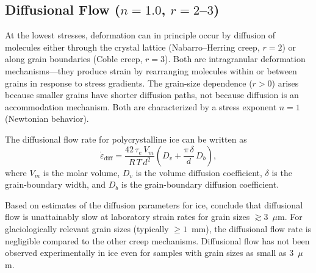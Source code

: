 \documentclass[11pt]{article}
\begin{document}
\subsection{Diffusional Flow ($n = 1.0$, $r = 2$--$3$)}
\label{sec:diffusion}

At the lowest stresses, deformation can in principle occur by diffusion of molecules either through the crystal lattice (Nabarro--Herring creep, $r = 2$) or along grain boundaries (Coble creep, $r = 3$).  Both are intragranular deformation mechanisms---they produce strain by rearranging molecules within or between grains in response to stress gradients.  The grain-size dependence ($r > 0$) arises because smaller grains have shorter diffusion paths, not because diffusion is an accommodation mechanism.  Both are characterized by a stress exponent $n = 1$ (Newtonian behavior).

\medskip
\noindent The diffusional flow rate for polycrystalline ice can be written as
\begin{equation}
  \dot{\varepsilon}_{\text{diff}} = \frac{42\,\tau_e\,V_m}{R\,T\,d^2}\!\left(D_v + \frac{\pi\,\delta}{d}\,D_b\right),
  \label{eq:diffusion}
\end{equation}
where $V_m$ is the molar volume, $D_v$ is the volume diffusion coefficient, $\delta$ is the grain-boundary width, and $D_b$ is the grain-boundary diffusion coefficient.

\medskip
\noindent Based on estimates of the diffusion parameters for ice, \cite{GoldsbyKohlstedt2001} conclude that diffusional flow is unattainably slow at laboratory strain rates for grain sizes $\gtrsim 3$~$\mu$m.  For glaciologically relevant grain sizes (typically $\geq 1$~mm), the diffusional flow rate is negligible compared to the other creep mechanisms.  Diffusional flow has not been observed experimentally in ice even for samples with grain sizes as small as 3~$\mu$m.
\end{document}
